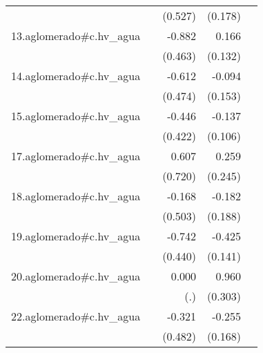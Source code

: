 {\begin{longtable}{l*{4}{D{.}{.}{-1}}}
            &                     &     (0.527)         &     (0.178)         &                     \\
\addlinespace
13.aglomerado#c.hv\_agua&                     &      -0.882         &       0.166         &                     \\
            &                     &     (0.463)         &     (0.132)         &                     \\
\addlinespace
14.aglomerado#c.hv\_agua&                     &      -0.612         &      -0.094         &                     \\
            &                     &     (0.474)         &     (0.153)         &                     \\
\addlinespace
15.aglomerado#c.hv\_agua&                     &      -0.446         &      -0.137         &                     \\
            &                     &     (0.422)         &     (0.106)         &                     \\
\addlinespace
17.aglomerado#c.hv\_agua&                     &       0.607         &       0.259         &                     \\
            &                     &     (0.720)         &     (0.245)         &                     \\
\addlinespace
18.aglomerado#c.hv\_agua&                     &      -0.168         &      -0.182         &                     \\
            &                     &     (0.503)         &     (0.188)         &                     \\
\addlinespace
19.aglomerado#c.hv\_agua&                     &      -0.742         &      -0.425\sym{**} &                     \\
            &                     &     (0.440)         &     (0.141)         &                     \\
\addlinespace
20.aglomerado#c.hv\_agua&                     &       0.000         &       0.960\sym{**} &                     \\
            &                     &         (.)         &     (0.303)         &                     \\
\addlinespace
22.aglomerado#c.hv\_agua&                     &      -0.321         &      -0.255         &                     \\
            &                     &     (0.482)         &     (0.168)         &                     \\

\end{longtable}}
